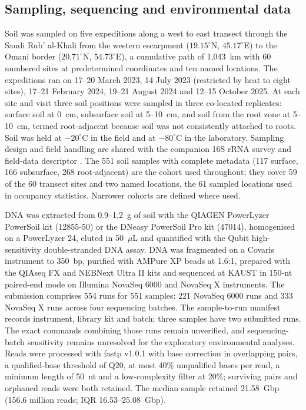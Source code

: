 \documentclass[11pt]{article}
\begin{document}
\subsection*{Sampling, sequencing and environmental data}
Soil was sampled on five expeditions along a west to east transect through the Saudi Rub' al-Khali
from the western escarpment ($19.15^\circ$N, $45.17^\circ$E) to the Omani border ($20.71^\circ$N,
$54.73^\circ$E), a cumulative path of 1{,}043~km with 60 numbered sites at predetermined coordinates
and ten named locations. The expeditions ran on 17--20 March 2023, 14 July 2023 (restricted by heat
to eight sites), 17--21 February 2024, 19--21 August 2024 and 12--15 October 2025. At each site and
visit three soil positions were sampled in three co-located replicates: surface soil at 0~cm,
subsurface soil at 5--10~cm, and soil from the root zone at 5--10~cm, termed root-adjacent because
soil was not consistently attached to roots. Soil was held at $-20^\circ$C in the field and at
$-80^\circ$C in the laboratory. Sampling design and field handling are shared with the companion
16S rRNA survey and field-data descriptor \citep{tawfiq2026companion,rubalkhali_datapaper}. The 551 soil samples with complete metadata (117 surface, 166 subsurface, 268 root-adjacent)
are the cohort used throughout; they cover 59 of the 60 transect sites and two named locations, the
61 sampled locations used in occupancy statistics. Narrower cohorts are defined where used.

DNA was extracted from 0.9--1.2~g of soil with the QIAGEN PowerLyzer PowerSoil kit (12855-50) or the
DNeasy PowerSoil Pro kit (47014), homogenised on a PowerLyzer 24, eluted in 50~$\mu$L and quantified
with the Qubit high-sensitivity double-stranded DNA assay. DNA was fragmented on a Covaris instrument
to 350~bp, purified with AMPure XP beads at 1.6:1, prepared with the QIAseq FX and NEBNext Ultra II
kits and sequenced at KAUST in 150-nt paired-end mode on Illumina NovaSeq 6000 and NovaSeq X instruments.
The submission comprises 554 runs for 551 samples: 221 NovaSeq 6000 runs and 333 NovaSeq X runs
across four sequencing batches. The sample-to-run manifest records instrument, library kit and
batch; three samples have two submitted runs. The exact commands combining those runs remain unverified, and sequencing-batch sensitivity remains unresolved for the exploratory environmental analyses. Reads were
processed with fastp v1.0.1 \citep{chen2018fastp} with base correction in overlapping pairs, a
qualified-base threshold of Q20, at most 40\% unqualified bases per read, a minimum length of 50~nt
and a low-complexity filter at 20\%; surviving pairs and orphaned reads were both retained. The
median sample retained 21.58~Gbp (156.6 million reads; IQR 16.53--25.08~Gbp).
\end{document}
